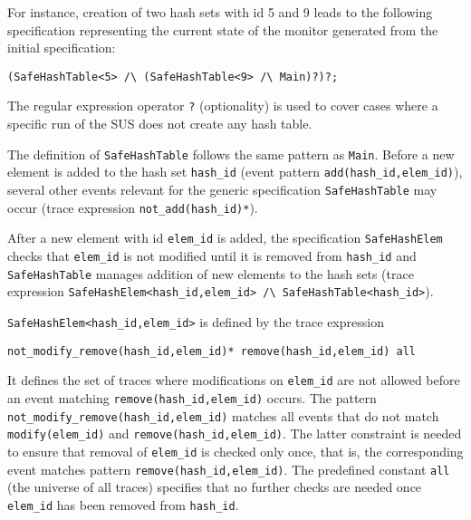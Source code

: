 For instance, creation of two hash sets with id 5 and 9 leads to the following specification representing the current state of the monitor generated from the initial specification: 
\begin{lstlisting}[basicstyle=\ttfamily\scriptsize]
(SafeHashTable<5> /\ (SafeHashTable<9> /\ Main)?)?;
\end{lstlisting}
The regular expression operator \lstinline{?} (optionality)
is used to cover cases where a specific run of the SUS does not create any hash table.

The definition of \lstinline{SafeHashTable} follows the same pattern as \lstinline{Main}.
Before a new element is added to the hash set \lstinline{hash_id} (event pattern \lstinline{add(hash_id,elem_id)}), several other events relevant for the generic specification \lstinline{SafeHashTable} may occur (trace expression \lstinline{not_add(hash_id)*}).

After a new element with id \lstinline{elem_id} is added, the specification \lstinline{SafeHashElem} checks that \lstinline{elem_id} is not modified
until it is removed from \lstinline{hash_id} and \lstinline{SafeHashTable} manages addition of new elements to the hash sets
(trace expression \lstinline{SafeHashElem<hash_id,elem_id> /\ SafeHashTable<hash_id>}).

\lstinline{SafeHashElem<hash_id,elem_id>} is defined by the trace expression
\begin{lstlisting}
not_modify_remove(hash_id,elem_id)* remove(hash_id,elem_id) all
\end{lstlisting}

It defines the set of traces where modifications on \lstinline{elem_id} are not allowed before an event matching \lstinline{remove(hash_id,elem_id)}
occurs. The pattern \lstinline{not_modify_remove(hash_id,elem_id)} matches all events that do not match \lstinline{modify(elem_id)} and \lstinline{remove(hash_id,elem_id)}. The latter constraint is needed to ensure that removal of \lstinline{elem_id} is checked only once, that is, the corresponding event matches pattern \lstinline{remove(hash_id,elem_id)}. 
The predefined constant \lstinline{all} (the universe of all traces) specifies that no further checks are needed once \lstinline{elem_id} has been removed from \lstinline{hash_id}.



